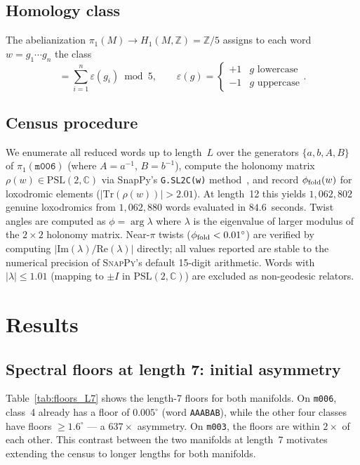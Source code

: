 \documentclass[12pt,a4paper]{article}
\newcommand{\PSL}{\mathrm{PSL}(2,\mathbb{C})}
\newcommand{\mfld}[1]{\texttt{#1}}
\newcommand{\word}[1]{\texttt{#1}}
\newcommand{\degr}{^{\circ}}
\begin{document}
\subsection{Homology class}
The abelianization $\pi_1(M)\to H_1(M,\mathbb{Z})=\mathbb{Z}/5$ assigns to
each word $w=g_1\cdots g_n$ the class
\begin{equation}
  [w] = \sum_{i=1}^n \varepsilon(g_i) \bmod 5,\qquad
  \varepsilon(g) = \begin{cases}+1 & g\text{ lowercase}\\-1 & g\text{ uppercase}\end{cases}.
\end{equation}

\subsection{Census procedure}
We enumerate all reduced words up to length~$L$ over the generators
$\{a,b,A,B\}$ of $\pi_1(\mfld{m006})$ (where $A=a^{-1}$, $B=b^{-1}$),
compute the holonomy matrix $\rho(w)\in\PSL$ via SnapPy's
\texttt{G.SL2C(w)} method~\cite{SnapPy}, and record $\phi_{\rm fold}(w)$
for loxodromic elements ($|\mathrm{Tr}(\rho(w))|>2.01$).
At length~12 this yields $1{,}062{,}802$ genuine loxodromics from
$1{,}062{,}880$ words evaluated in $84.6$~seconds.
Twist angles are computed as $\phi=\arg\lambda$ where $\lambda$ is the
eigenvalue of larger modulus of the $2\times 2$ holonomy matrix.
Near-$\pi$ twists ($\phi_{\rm fold}<0.01\degr$) are verified by computing
$|\mathrm{Im}(\lambda)/\mathrm{Re}(\lambda)|$ directly; all values
reported are stable to the numerical precision of \textsc{SnapPy}'s
default 15-digit arithmetic.
Words with $|\lambda|\leq 1.01$ (mapping to $\pm I$ in $\PSL$) are excluded
as non-geodesic relators.

\section{Results}
\label{sec:results}

\subsection{Spectral floors at length 7: initial asymmetry}
Table~\ref{tab:floors_L7} shows the length-7 floors for both manifolds.
On \mfld{m006}, class~4 already has a floor of $0.005\degr$ (word
\word{AAABAB}), while the other four classes have floors $\geq 1.6\degr$
--- a $637\times$ asymmetry.
On \mfld{m003}, the floors are within $2\times$ of each other.
This contrast between the two manifolds at length~7 motivates
extending the census to longer lengths for both manifolds.
\end{document}
